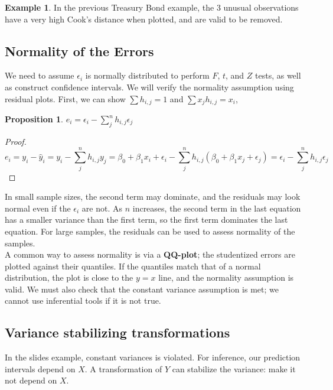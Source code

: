 \documentclass[12pt, a4paper]{article}
\theoremstyle{definition}
\newtheorem{proposition}{Proposition}
\newtheorem{example}{Example}
\newcommand{\eps}{\epsilon}
\begin{document}
	\begin{example}
		In the previous Treasury Bond example, the 3 unusual observations have a very high Cook's distance when plotted, and are valid to be removed.
	\end{example}

	\subsection{Normality of the Errors}
	
	We need to assume $\eps_i$ is normally distributed to perform $F$, $t$, and $Z$ tests, as well as construct confidence intervals. We will verify the normality assumption using residual plots. First, we can show $\sum h_{i,j} = 1$ and $\sum x_jh_{i,j} = x_i$,
	\begin{proposition}
		$e_i = \eps_i - \sum_j^n h_{i,j} \eps_j$
	\end{proposition}
 	\begin{proof}
 		$$
 		e_i = y_i - \hat y_i = y_i - \sum_j^n h_{i,j}y_j = 
 		\beta_0 + \beta_1 x_i + \eps_i - 
 		\sum_j^n h_{i,j}(\beta_0 + \beta_1 x_j + \eps_j) 
 		= \eps_i - \sum_j^n h_{i,j} \eps_j
 		$$
 	\end{proof}
	In small sample sizes, the second term may dominate, and the residuals may look normal even if the $\eps_i$ are not.
	As $n$ increases, the second term in the last equation has a smaller variance than the first term, so the first term dominates the last equation. For large samples, the residuals can be used to assess normality of the samples.\\
	
  	A common way to assess normality is via a {\bf QQ-plot}; the studentized errors are plotted against their quantiles. If the quantiles match that of a normal distribution, the plot is close to the $y=x$ line, and the normality assumption is valid. We must also check that the constant variance assumption is met; we cannot use inferential tools if it is not true. 
  	
  	\subsection{Variance stabilizing transformations}
  	
  	In the slides example, constant variances is violated. For inference, our prediction intervals depend on $X$. A transformation of $Y$ can stabilize the variance: make it not depend on $X$.\\
  	
\end{document}
